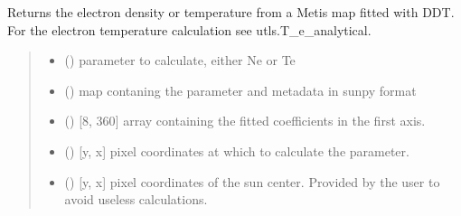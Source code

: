 \documentclass[letterpaper,10pt,english]{sphinxmanual}
\begin{document}
\begin{fulllineitems}
\label{\detokenize{doppler_dimming_lib:doppler_dimming_lib.metis.get_3d_param}}
\pysigstartsignatures
{}
\pysigstopsignatures
\sphinxAtStartPar
Returns the electron density or temperature from a Metis map fitted with DDT. For the electron temperature calculation see utls.T\_e\_analytical.
\begin{quote}\begin{description}
\begin{itemize}
\item {} 
\sphinxAtStartPar
{} () \textendash{} parameter to calculate, either Ne or Te

\item {} 
\sphinxAtStartPar
{} () \textendash{} map contaning the parameter and metadata in sunpy format

\item {} 
\sphinxAtStartPar
{} () \textendash{} {[}8, 360{]} array containing the fitted coefficients in the first axis.

\item {} 
\sphinxAtStartPar
{} () \textendash{} {[}y, x{]} pixel coordinates at which to calculate the parameter.

\item {} 
\sphinxAtStartPar
{} () \textendash{} {[}y, x{]} pixel coordinates of the sun center. Provided by the user to avoid useless calculations.


\end{itemize}
\end{description}
\end{quote}
\end{fulllineitems}
\end{document}
